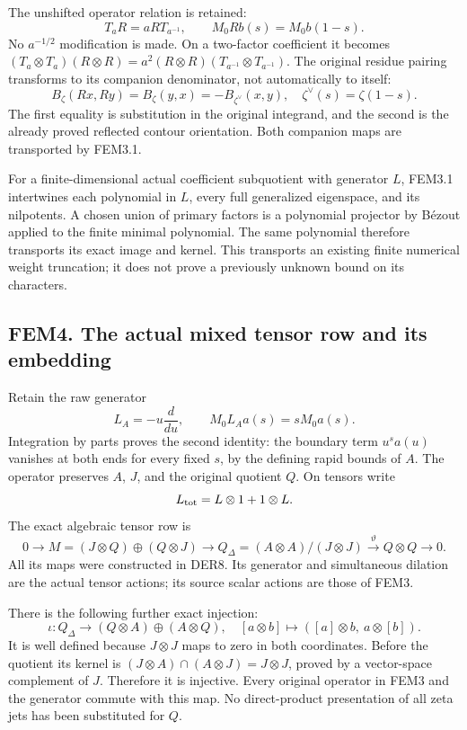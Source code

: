The unshifted operator relation is retained: \[
T_aR=aRT_{a^{-1}},\qquad M_0Rb(s)=M_0b(1-s).
\tag{FEM3.3}
\] No \(a^{-1/2}\) modification is made. On a two-factor coefficient it
becomes \((T_a\otimes T_a)(R\otimes R)
=a^2(R\otimes R)(T_{a^{-1}}\otimes T_{a^{-1}})\). The original residue
pairing transforms to its companion denominator, not automatically to
itself: \[
B_\zeta(Rx,Ry)=B_\zeta(y,x)=-B_{\zeta^\vee}(x,y),
\quad \zeta^\vee(s)=\zeta(1-s).
\tag{FEM3.4}
\] The first equality is substitution in the original integrand, and the
second is the already proved reflected contour orientation. Both
companion maps are transported by FEM3.1.

For a finite-dimensional actual coefficient subquotient with generator
\(L\), FEM3.1 intertwines each polynomial in \(L\), every full
generalized eigenspace, and its nilpotents. A chosen union of primary
factors is a polynomial projector by Bézout applied to the finite
minimal polynomial. The same polynomial therefore transports its exact
image and kernel. This transports an existing finite numerical weight
truncation; it does not prove a previously unknown bound on its
characters.

\subsection{FEM4. The actual mixed tensor row and its
embedding}\label{fem4.-the-actual-mixed-tensor-row-and-its-embedding}

Retain the raw generator \[
L_A=-u\frac{d}{du},\qquad M_0L_Aa(s)=sM_0a(s).
\tag{FEM4.1}
\] Integration by parts proves the second identity: the boundary term
\(u^sa(u)\) vanishes at both ends for every fixed \(s\), by the defining
rapid bounds of \(A\). The operator preserves \(A\), \(J\), and the
original quotient \(Q\). On tensors write \[
L_{\rm tot}=L\otimes1+1\otimes L.
\] The exact algebraic tensor row is \[
0\to M=(J\otimes Q)\oplus(Q\otimes J)
\longrightarrow Q_\Delta=(A\otimes A)/(J\otimes J)
\xrightarrow{\vartheta}Q\otimes Q\to0.
\tag{FEM4.2}
\] All its maps were constructed in DER8. Its generator and simultaneous
dilation are the actual tensor actions; its source scalar actions are
those of FEM3.

There is the following further exact injection: \[
\iota:Q_\Delta\longrightarrow(Q\otimes A)\oplus(A\otimes Q),
\quad
[a\otimes b]\longmapsto([a]\otimes b,\ a\otimes[b]).
\tag{FEM4.3}
\] It is well defined because \(J\otimes J\) maps to zero in both
coordinates. Before the quotient its kernel is
\((J\otimes A)\cap(A\otimes J)=J\otimes J\), proved by a vector-space
complement of \(J\). Therefore it is injective. Every original operator
in FEM3 and the generator commute with this map. No direct-product
presentation of all zeta jets has been substituted for \(Q\).

